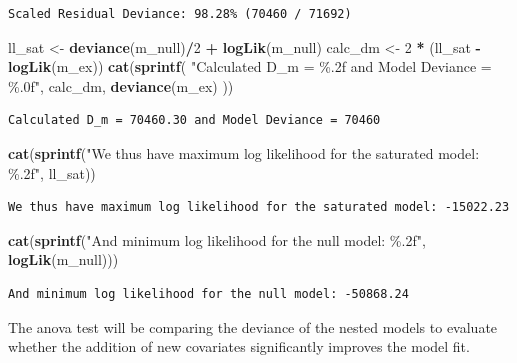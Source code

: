 \documentclass[
  english,
  11pt,
]{article}
\newenvironment{Shaded}{\begin{snugshade}}{\end{snugshade}}
\newcommand{\DecValTok}[1]{\textcolor[rgb]{0.00,0.00,0.81}{#1}}
\newcommand{\FunctionTok}[1]{\textcolor[rgb]{0.13,0.29,0.53}{\textbf{#1}}}
\newcommand{\NormalTok}[1]{#1}
\newcommand{\OtherTok}[1]{\textcolor[rgb]{0.56,0.35,0.01}{#1}}
\newcommand{\SpecialCharTok}[1]{\textcolor[rgb]{0.81,0.36,0.00}{\textbf{#1}}}
\newcommand{\StringTok}[1]{\textcolor[rgb]{0.31,0.60,0.02}{#1}}
\begin{document}
\begin{verbatim}
Scaled Residual Deviance: 98.28% (70460 / 71692)
\end{verbatim}

\begin{Shaded}
\begin{Highlighting}[]
\NormalTok{ll\_sat }\OtherTok{\textless{}{-}} \FunctionTok{deviance}\NormalTok{(m\_null)}\SpecialCharTok{/}\DecValTok{2} \SpecialCharTok{+} \FunctionTok{logLik}\NormalTok{(m\_null)}
\NormalTok{calc\_dm }\OtherTok{\textless{}{-}} \DecValTok{2} \SpecialCharTok{*}\NormalTok{ (ll\_sat }\SpecialCharTok{{-}} \FunctionTok{logLik}\NormalTok{(m\_ex))}
\FunctionTok{cat}\NormalTok{(}\FunctionTok{sprintf}\NormalTok{(}
    \StringTok{"Calculated D\_m = \%.2f and Model Deviance = \%.0f"}\NormalTok{, }
\NormalTok{    calc\_dm,}
    \FunctionTok{deviance}\NormalTok{(m\_ex)}
\NormalTok{))}
\end{Highlighting}
\end{Shaded}

\begin{verbatim}
Calculated D_m = 70460.30 and Model Deviance = 70460
\end{verbatim}

\begin{Shaded}
\begin{Highlighting}[]
\FunctionTok{cat}\NormalTok{(}\FunctionTok{sprintf}\NormalTok{(}\StringTok{"We thus have maximum log likelihood for the saturated model: \%.2f"}\NormalTok{, ll\_sat))}
\end{Highlighting}
\end{Shaded}

\begin{verbatim}
We thus have maximum log likelihood for the saturated model: -15022.23
\end{verbatim}

\begin{Shaded}
\begin{Highlighting}[]
\FunctionTok{cat}\NormalTok{(}\FunctionTok{sprintf}\NormalTok{(}\StringTok{"And minimum log likelihood for the null model: \%.2f"}\NormalTok{, }\FunctionTok{logLik}\NormalTok{(m\_null)))}
\end{Highlighting}
\end{Shaded}

\begin{verbatim}
And minimum log likelihood for the null model: -50868.24
\end{verbatim}

The anova test will be comparing the deviance of the nested models to
evaluate whether the addition of new covariates significantly improves
the model fit.
\end{document}
